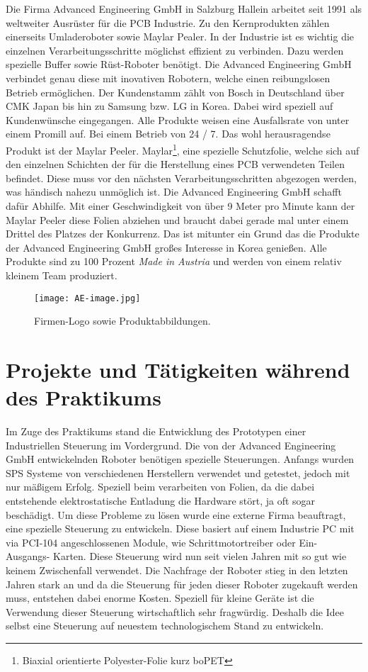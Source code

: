 \documentclass[praktikum,german]{hgbthesis}
\begin{document}
Die Firma Advanced Engineering GmbH in Salzburg Hallein arbeitet seit 1991 als weltweiter Ausrüster für die PCB Industrie.
Zu den Kernprodukten zählen einerseits Umladeroboter sowie Maylar Pealer. In der Industrie ist es wichtig die einzelnen Verarbeitungsschritte möglichst effizient zu verbinden. Dazu werden spezielle Buffer sowie Rüst-Roboter benötigt. Die Advanced Engineering GmbH verbindet genau diese mit inovativen Robotern, welche einen reibungslosen Betrieb ermöglichen. Der Kundenstamm zählt von Bosch in Deutschland über CMK Japan bis hin zu Samsung bzw. LG in Korea. Dabei wird speziell auf Kundenwünsche eingegangen. Alle Produkte weisen eine Ausfallsrate von unter einem Promill auf. Bei einem Betrieb von 24 / 7. Das wohl herausragendse Produkt ist der Maylar Peeler. Maylar\footnote{Biaxial orientierte Polyester-Folie kurz boPET}, eine spezielle Schutzfolie, welche sich auf den einzelnen Schichten der für die Herstellung eines PCB verwendeten Teilen befindet. Diese muss vor den nächsten Verarbeitungsschritten abgezogen werden, was händisch nahezu unmöglich ist. Die Advanced Engineering GmbH schafft dafür Abhilfe. Mit einer Geschwindigkeit von über 9 Meter pro Minute kann der Maylar Peeler diese Folien abziehen und braucht dabei gerade mal unter einem Drittel des Platzes der Konkurrenz. Das ist mitunter ein Grund das die Produkte der Advanced Engineering GmbH großes Interesse in Korea genießen. Alle Produkte sind zu 100 Prozent \emph{Made in Austria} und werden von einem relativ kleinem Team produziert.

\begin{figure}[H]
\centering
\texttt{[image: AE-image.jpg]}
\caption{Firmen-Logo sowie Produktabbildungen.}
\label{fig:company}
\end{figure}

\chapter{Projekte und Tätigkeiten während des Praktikums}
Im Zuge des Praktikums stand die Entwicklung des Prototypen einer Industriellen Steuerung im Vordergrund. Die von der Advanced Engineering GmbH entwickelnden Roboter benötigen spezielle Steuerungen. Anfangs wurden SPS Systeme von verschiedenen Herstellern verwendet und getestet, jedoch mit nur mäßigem Erfolg. Speziell beim verarbeiten von Folien, da die dabei entstehende elektrostatische Entladung die Hardware stört, ja oft sogar beschädigt. Um diese Probleme zu lösen wurde eine externe Firma beauftragt, eine spezielle Steuerung zu entwickeln. Diese basiert auf einem Industrie PC mit via PCI-104 angeschlossenen Module, wie Schrittmotortreiber oder Ein- Ausgangs- Karten. Diese Steuerung wird nun seit vielen Jahren mit so gut wie keinem Zwischenfall verwendet. Die Nachfrage der Roboter stieg in den letzten Jahren stark an und da die Steuerung für jeden dieser Roboter zugekauft werden muss, entstehen dabei enorme Kosten. Speziell für kleine Geräte ist die Verwendung dieser Steuerung wirtschaftlich sehr fragwürdig. Deshalb die Idee selbst eine Steuerung auf neuestem technologischem Stand zu entwickeln. 
\end{document}
